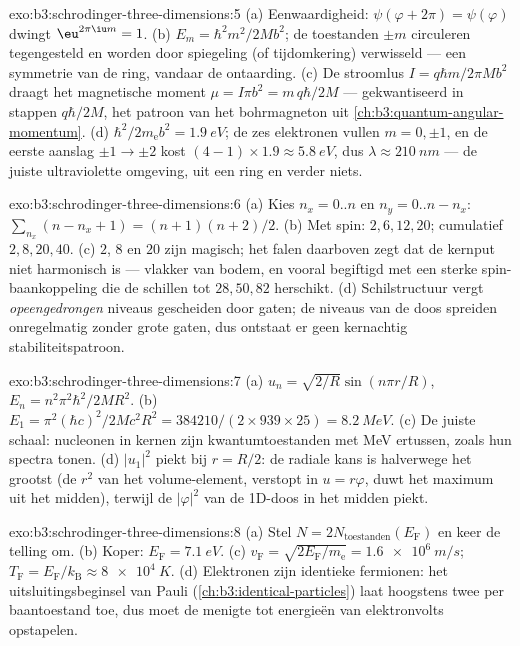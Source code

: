 \begin{solution}{exo:b3:schrodinger-three-dimensions:5}
(a) Eenwaardigheid: $\psi(\varphi + 2\pi) = \psi(\varphi)$ dwingt
$\eu^{2\pi\iu m} = 1$. (b) $E_m = \hbar^2m^2/2Mb^2$; de toestanden $\pm
m$ circuleren tegengesteld en worden door spiegeling (of tijdomkering)
verwisseld --- een symmetrie van de ring, vandaar de ontaarding. (c) De
stroomlus $I = q\hbar m/2\pi Mb^2$ draagt het magnetische moment
$\mu = I\pi b^2 = m\,q\hbar/2M$ --- gekwantiseerd in stappen $q\hbar/2M$,
het patroon van het bohrmagneton uit
\cref{ch:b3:quantum-angular-momentum}.
(d) $\hbar^2/2m_{\text{e}}b^2 = \qty{1.9}{eV}$; de zes elektronen vullen
$m = 0, \pm1$, en de eerste aanslag $\pm1 \to \pm2$ kost
$(4-1) \times 1.9 \approx \qty{5.8}{eV}$, dus $\lambda \approx
\qty{210}{nm}$ --- de juiste ultraviolette omgeving, uit een ring en
verder niets.
\end{solution}

\begin{solution}{exo:b3:schrodinger-three-dimensions:6}
(a) Kies $n_x = 0..n$ en $n_y = 0..n - n_x$: $\sum_{n_x}(n - n_x
+ 1) = (n+1)(n+2)/2$. (b) Met spin: $2, 6, 12, 20$; cumulatief $2,
8, 20, 40$. (c) $2$, $8$ en $20$ zijn magisch; het falen daarboven zegt
dat de kernput niet harmonisch is --- vlakker van bodem, en vooral
begiftigd met een sterke spin-baankoppeling die de schillen tot $28, 50, 82$ herschikt. (d) Schilstructuur vergt \emph{opeengedrongen} niveaus
gescheiden door gaten; de niveaus van de doos spreiden onregelmatig
zonder grote gaten, dus ontstaat er geen kernachtig stabiliteitspatroon.
\end{solution}

\begin{solution}{exo:b3:schrodinger-three-dimensions:7}
(a) $u_n = \sqrt{2/R}\sin(n\pi r/R)$, $E_n = n^2\pi^2\hbar^2/2MR^2$.
(b) $E_1 = \pi^2(\hbar c)^2/2Mc^2R^2 = 384210/(2 \times 939 \times
25) = \qty{8.2}{MeV}$. (c) De juiste schaal: nucleonen in kernen zijn
kwantumtoestanden met MeV ertussen, zoals hun spectra tonen. (d)
$|u_1|^2$ piekt bij $r = R/2$: de radiale kans is halverwege het grootst
(de $r^2$ van het volume-element, verstopt in $u = r\varphi$, duwt het
maximum uit het midden), terwijl de $|\varphi|^2$ van de 1D-doos in het
midden piekt.
\end{solution}

\begin{solution}{exo:b3:schrodinger-three-dimensions:8}
(a) Stel $N = 2N_{\text{toestanden}}(E_{\text{F}})$ en keer de telling om.
(b) Koper: $E_{\text{F}} = \qty{7.1}{eV}$. (c) $v_{\text{F}} =
\sqrt{2E_{\text{F}}/m_{\text{e}}} = \qty{1.6e6}{m/s}$;
$T_{\text{F}} = E_{\text{F}}/k_{\text{B}} \approx \qty{8e4}{K}$. (d)
Elektronen zijn identieke fermionen: het uitsluitingsbeginsel van Pauli
(\cref{ch:b3:identical-particles}) laat hoogstens twee per baantoestand
toe, dus moet de menigte tot energieën van elektronvolts opstapelen.
\end{solution}

